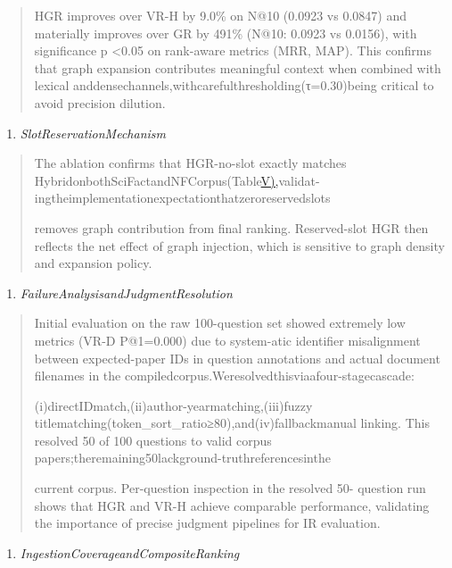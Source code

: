\documentclass[
]{article}
\begin{document}
\begin{quote}
HGR improves over VR-H by 9.0\% on N@10 (0.0923 vs 0.0847) and materially improves over GR by 491\% (N@10: 0.0923 vs 0.0156), with significance p \textless0.05 on rank-aware metrics (MRR, MAP). This confirms that graph expansion contributes meaningful context when combined with lexical anddensechannels,withcarefulthresholding(τ=0.30)being critical to avoid precision dilution.
\end{quote}

\begin{enumerate}
\def\labelenumi{\Alph{enumi}.}
\setcounter{enumi}{2}
\item
  \emph{SlotReservationMechanism}
\end{enumerate}

\begin{quote}
The ablation confirms that HGR-no-slot exactly matches HybridonbothSciFactandNFCorpus(Table\hyperref[_bookmark12]{V),}validat- ingtheimplementationexpectationthatzeroreservedslots

removes graph contribution from final ranking. Reserved-slot HGR then reflects the net effect of graph injection, which is sensitive to graph density and expansion policy.
\end{quote}

\begin{enumerate}
\def\labelenumi{\Alph{enumi}.}
\setcounter{enumi}{3}
\item
  \emph{FailureAnalysisandJudgmentResolution}
\end{enumerate}

\begin{quote}
Initial evaluation on the raw 100-question set showed extremely low metrics (VR-D P@1=0.000) due to system-atic identifier misalignment between expected-paper IDs in question annotations and actual document filenames in the compiledcorpus.Weresolvedthisviaafour-stagecascade:

(i)directIDmatch,(ii)author-yearmatching,(iii)fuzzy titlematching(token\_sort\_ratio≥80),and(iv)fallbackmanual linking. This resolved 50 of 100 questions to valid corpus papers;theremaining50lackground-truthreferencesinthe

current corpus. Per-question inspection in the resolved 50- question run shows that HGR and VR-H achieve comparable performance, validating the importance of precise judgment pipelines for IR evaluation.
\end{quote}

\begin{enumerate}
\def\labelenumi{\Alph{enumi}.}
\setcounter{enumi}{4}
\item
  \emph{IngestionCoverageandCompositeRanking}
\end{enumerate}
\end{document}
